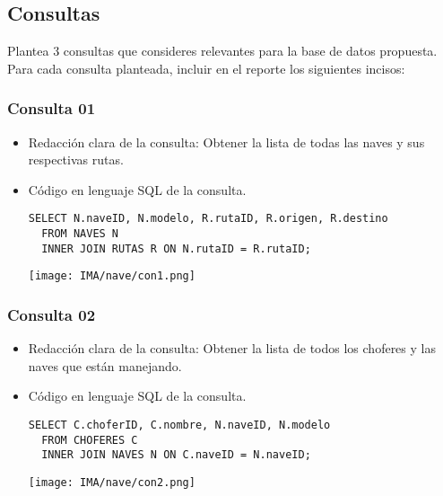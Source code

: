 \subsection{Consultas}

Plantea 3 consultas que consideres relevantes para la base de datos propuesta. Para cada consulta planteada, incluir en el reporte los siguientes incisos:


\subsubsection*{Consulta 01}

\begin{itemize} 
  \item Redacción clara de la consulta: Obtener la lista de todas las naves y sus respectivas rutas. 
  \item Código en lenguaje SQL de la consulta.

  \begin{lstlisting}[caption={Consulta de naves y rutas}, label={lst:sql_estadios}]
  SELECT N.naveID, N.modelo, R.rutaID, R.origen, R.destino
  FROM NAVES N
  INNER JOIN RUTAS R ON N.rutaID = R.rutaID;
  \end{lstlisting}    

    \begin{center}
      \texttt{[image: IMA/nave/con1.png]}
    \end{center}
    
\end{itemize}


\subsubsection*{Consulta 02}

\begin{itemize} 
  \item Redacción clara de la consulta: Obtener la lista de todos los choferes y las naves que están manejando. 
  \item Código en lenguaje SQL de la consulta.

  \begin{lstlisting}[caption={Consulta de choferes y naves}, label={lst:sql_estadios}]
  SELECT C.choferID, C.nombre, N.naveID, N.modelo
  FROM CHOFERES C
  INNER JOIN NAVES N ON C.naveID = N.naveID;
  \end{lstlisting}    

    \begin{center}
      \texttt{[image: IMA/nave/con2.png]}
    \end{center}
    
\end{itemize}


